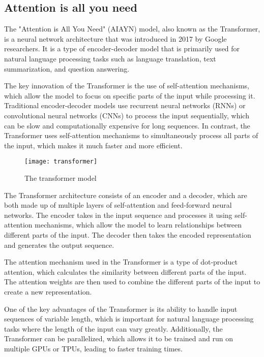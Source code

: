 \subsection{Attention is all you need}

The "Attention is All You Need" (AIAYN) \cite{vaswani} model, also known as the Transformer, is a neural network architecture that was introduced in 2017 by Google researchers.
It is a type of encoder-decoder model that is primarily used for natural language processing tasks such as language translation, text summarization, and question answering.

The key innovation of the Transformer is the use of self-attention mechanisms, which allow the model to focus on specific parts of the input while processing it.
Traditional encoder-decoder models use recurrent neural networks (RNNs) or convolutional neural networks (CNNs) to process the input sequentially, which can be slow and computationally expensive for long sequences.
In contrast, the Transformer uses self-attention mechanisms to simultaneously process all parts of the input, which makes it much faster and more efficient.

\begin{figure}[H]
  \centering
  \texttt{[image: transformer]}
  \caption{The transformer model \cite{vaswani}}
\end{figure}

The Transformer architecture consists of an encoder and a decoder, which are both made up of multiple layers of self-attention and feed-forward neural networks.
The encoder takes in the input sequence and processes it using self-attention mechanisms, which allow the model to learn relationships between different parts of the input.
The decoder then takes the encoded representation and generates the output sequence.

The attention mechanism used in the Transformer is a type of dot-product attention, which calculates the similarity between different parts of the input.
The attention weights are then used to combine the different parts of the input to create a new representation.

One of the key advantages of the Transformer is its ability to handle input sequences of variable length, which is important for natural language processing tasks where the length of the input can vary greatly.
Additionally, the Transformer can be parallelized, which allows it to be trained and run on multiple GPUs or TPUs, leading to faster training times.

